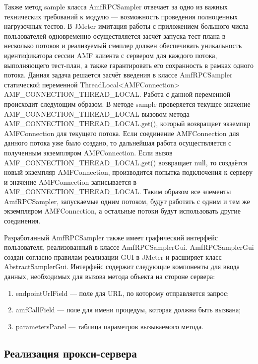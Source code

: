 Также метод sample класса AmfRPCSampler отвечает за одно из важных технических требований к модулю --- возможность проведения 
полноценных нагрузочных тестов. В JMeter имитация работы с приложением большого числа пользователей одновременно осуществляется 
засчёт запуска тест-плана в несколько потоков и реализуемый сэмплер должен обеспечивать уникальность идентификатора сессии AMF 
клиента с сервером для каждого потока, выполняющего тест-план, а также гарантировать его сохранность в рамках одного потока. 
Данная задача решается засчёт введения в классе AmfRPCSampler статической переменной ThreadLocal<AMFConnection> AMF_CONNECTION_THREAD_LOCAL. 
Работа с данной переменной происходит следующим образом. В методе sample проверяется текущее значение AMF_CONNECTION_THREAD_LOCAL 
вызовом метода AMF_CONNECTION_THREAD_LOCAL.get(), который возвращает экземпяр AMFConnection для текущего потока. 
Если соединение AMFConnection для данного потока уже было создано, то дальнейшая работа осуществляется с полученным экземпляром 
AMFConnection. Если вызов AMF_CONNECTION_THREAD_LOCAL.get() возвращает null, то создаётся новый экземпляр AMFConnection, производится попытка 
подключения к серверу и значение AMFConnection записывается в AMF_CONNECTION_THREAD_LOCAL. Таким образом все элементы AmfRPCSampler, 
запускаемые одним потоком, будут работать с одним и тем же экземпляром AMFConnection, а остальные потоки будут использовать другие 
соединения.

Разработанный AmfRPCSampler также имеет графический интерфейс пользователя, реализованный в классе AmfRPCSamplerGui. AmfRPCSamplerGui 
создан согласно правилам реализации GUI в JMeter и расширяет класс AbstractSamplerGui. Интерфейс содержит следующие компоненты для ввода данных, 
необходимых для вызова метода объекта на стороне сервера:

\begin{enumerate}
\item endpointUrlField --- поле для URL, по которому отправляется запрос;
\item amfCallField --- поле для имени процедуы, которая должна быть вызвана; 
\item parametersPanel --- таблица параметров вызываемого метода.
\end{enumerate}    

\subsection{Реализация прокси-сервера}

